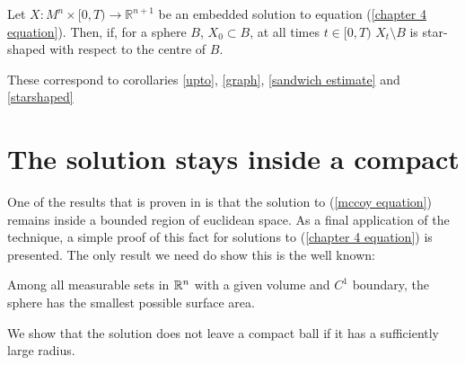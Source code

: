 \begin{cor}
	Let $ X : M^n \times [0, T) \to \mathbb{R}^{n+1} $ be an embedded solution to equation (\ref{chapter 4 equation}). Then, if, for a sphere $B$, $X_0\subset B$, at all times $t \in [0, T)$ $X_t\setminus B$ is star-shaped with respect to the centre of $B$.\label{starshaped ch4}
\end{cor}

These correspond to corollaries \ref{upto}, \ref{graph}, \ref{sandwich estimate} and \ref{starshaped}
 
\section{The solution stays inside a compact}

One of the results that is proven in \cite{mccoy} is that the solution to (\ref{mccoy equation}) remains inside a bounded region of euclidean space. As a final application of the technique, a simple proof of this fact for solutions to (\ref{chapter 4 equation}) is presented. The only result we need do show this is the well known:
\begin{theorem}
	Among all measurable sets in $\mathbb{R}^n$ with a given volume and $C^1$ boundary, the sphere has the smallest possible surface area.
\end{theorem} 
We show that the solution does not leave a compact ball if it has a sufficiently large radius.
\begin{comment}
First, we want to prove the following lemma: 
	
	\begin{lemma}
		Let $X:M^n\times [0,T) \rightarrow \R^{n+1}$ be a $C^2$ embedded solution to equation (\ref{chapter 4 equation}), let $\pi$ be a plane. If $X_0 \subset H^-(\pi)$, then it is not possible that $X_t \subset H^+(\pi)$ for all times $t \in [0,T)$\label{cannot cross plane ch4}
	\end{lemma}
	In other words, a solution cannot completely cross from one side of a given plane to the other side.
	\begin{proof}
		Suppose by contradiction that this happens. We can always reflect $X_t$ strictly about $\pi$, by theorem \ref{chow gulliver chapter 4}, because it does not intersect $X_0$. This implies that $X_t^\pi\cap H^-(\pi) \subset \mathrm{int}(X_t)\cap  H^-(\pi)$. But $X_t \subset H^+(\pi)$  implies that $\mathrm{int}(X_t)\cap  H^-(\pi)=\emptyset$ and  $\emptyset \neq X_t^\pi \subset H^-(\pi)$, a contradiction
	\end{proof}
	Finally, we show that the solution does not leave a compact ball if it has a sufficiently large radius. 
\end{comment}
